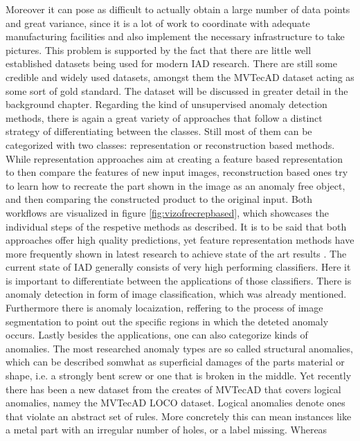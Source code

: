 Moreover it can pose as difficult to actually obtain a large number of data points and great variance, since it is a lot of work to 
coordinate with adequate manufacturing facilities and also implement the necessary infrastructure to take pictures. This problem is supported 
by the fact that there are little well established datasets being used for modern IAD research. There are still some credible and widely used 
datasets, amongst them the MVTecAD \cite{MVTEC_Bergmann_2021} dataset acting as some sort of gold standard. The dataset will be discussed in greater detail 
in the background chapter. Regarding the kind of unsupervised anomaly detection methods, there is again a great variety of approaches that follow a 
distinct strategy of differentiating between the classes. Still most of them can be categorized with two classes: representation 
or reconstruction based methods. While representation approaches aim at creating a feature based representation to then 
compare the features of new input images, reconstruction based ones try to learn how to recreate the part shown in the image as an anomaly 
free object, and then comparing the constructed product to the original input. Both workflows are visualized in figure \ref{fig:vizofrecrepbased}, which showcases 
the individual steps of the respetive methods as described. It is to be said that both approaches offer high quality predictions, yet 
feature representation methods have more frequently shown in latest research to achieve state of the art results \cite{liu2024deep}. %
\newline
The current state of IAD generally consists of very high performing classifiers. Here it is important to differentiate between the  
applications of those classifiers. There is anomaly detection in form of image classification, which was already mentioned. 
Furthermore there is anomaly locaization, reffering to the process of image segmentation to point out the specific regions in which 
the deteted anomaly occurs. Lastly besides the applications, one can also categorize kinds of anomalies. The most researched anomaly types 
are so called structural anomalies, which can be described somwhat as superficial damages of the parts material or shape, i.e. a strongly 
bent screw or one that is broken in the middle. Yet recently there has been a new dataset from the creates of MVTecAD that covers logical 
anomalies, namey the MVTecAD LOCO \cite{LOCODentsAndScratchesBergmann2022} dataset. Logical anomalies denote ones that violate an abstract 
set of rules. More concretely this can mean instances like a metal part with an irregular number of holes, or a label missing. Whereas 
